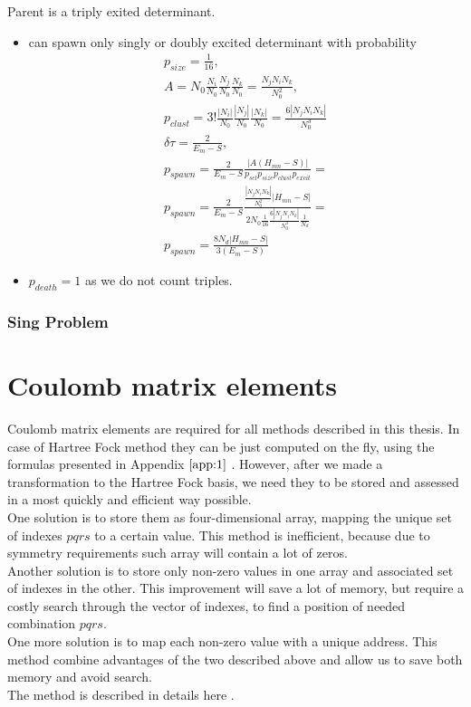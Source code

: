 \documentclass[twoside,english]{uiofysmaster}
\theoremstyle{definition}
\begin{document}
\begin{enumerate}
Parent is a triply exited determinant.
\begin{itemize}
	\item can spawn only singly or doubly excited determinant with  probability  
\begin{align}
	p_{size} = \frac{1}{16},\\
	A = N_0\frac{N_i}{N_0}\frac{N_j}{N_0}\frac{N_k}{N_0}=\frac{N_jN_iN_k}{N_0^2},\\
	p_{clust}=3!\frac{|N_i|}{N_0}\frac{|N_j|}{N_0}\frac{|N_k|}{N_0}=\frac{6|N_jN_iN_k|}{N_0^3}\\
	\delta \tau = \frac{2}{E_m  - S},\\
	p_{spawn} = \frac{2}{E_m - S} \frac{|A(H_{mn}-S)|}{ p_{sel}  p_{size} p_{clust} p_{excit}  }=\\
	p_{spawn} = \frac{2}{E_m - S} \frac{\frac{|N_jN_iN_k|}{N_0^2}|H_{mn}-S|}{ 2N_0 \frac{1}{16} \frac{6|N_jN_iN_k|}{N_0^3} \frac{1}{N_d}}= \\
p_{spawn} = \frac{8N_d|H_{mn}-S|}{3(E_m - S)}
\end{align}
	\item $p_{death} = 1$ as we do not count triples.
\end{itemize}
\end{enumerate}
\subsection{Sing Problem}
\chapter{Coulomb matrix elements}
Coulomb matrix elements are required for all methods described in this thesis. In case of Hartree Fock method they can be just computed on the fly, using the formulas presented in Appendix $\ref{app:1}$ . However, after we made a transformation to the Hartree Fock basis, we need they to be stored and assessed in a most quickly and efficient way possible. \\
One solution is to store them as four-dimensional array, mapping the unique set of indexes $pqrs$ to a certain value. This method is inefficient, because due to symmetry requirements such array will contain a lot of zeros.\\
Another solution is to store only non-zero values in one array and associated set of indexes  in the other. This improvement will save a lot of memory, but require a costly search through the vector of indexes, to find a position of needed combination $pqrs$.\\
One more solution is to map each non-zero value with a unique address. This method combine advantages of the two described above and allow us to save both memory and avoid search.\\
The method is described in details here \cite{leikangerFullConfigurationInteraction}.
\end{document}
